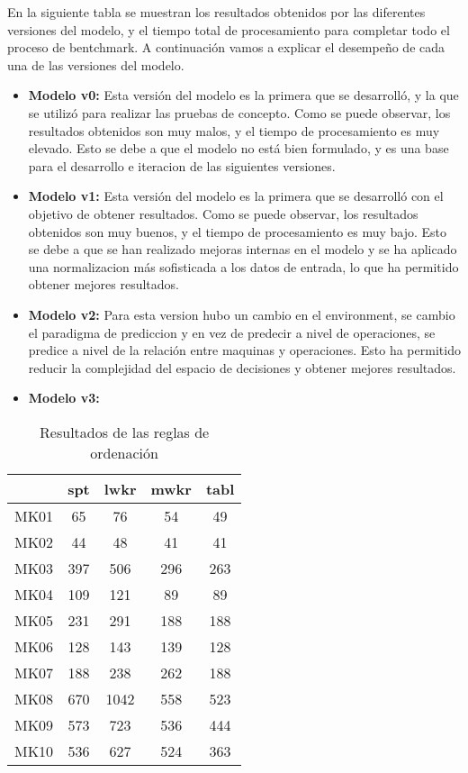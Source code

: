 En la siguiente tabla se muestran los resultados obtenidos por las
diferentes versiones del modelo, y el tiempo total de procesamiento
para completar todo el proceso de bentchmark. A continuación vamos a
explicar el desempeño de cada una de las versiones del modelo.
\begin{itemize}
    \item \textbf{Modelo v0:} Esta versión del modelo es la primera que se
        desarrolló, y la que se utilizó para realizar las pruebas de
        concepto. Como se puede observar, los resultados obtenidos son
        muy malos, y el tiempo de procesamiento es muy elevado. Esto
        se debe a que el modelo no está bien formulado, y es una base
        para el desarrollo e iteracion de las siguientes versiones.
    \item \textbf{Modelo v1:} Esta versión del modelo es la primera que
        se desarrolló con el objetivo de obtener resultados. Como se
        puede observar, los resultados obtenidos son muy buenos, y el
        tiempo de procesamiento es muy bajo. Esto se debe a que se han
        realizado mejoras internas en el modelo y se ha aplicado una
        normalizacion más sofisticada a los datos de entrada, lo que
        ha permitido obtener mejores resultados.
    \item \textbf{Modelo v2:} Para esta version hubo un cambio en el
        environment, se cambio el paradigma de prediccion y en vez
        de predecir a nivel de operaciones, se predice a nivel de
        la relación entre maquinas y operaciones. Esto ha permitido
        reducir la complejidad del espacio de decisiones y obtener
        mejores resultados.
    \item \textbf{Modelo v3:}
\end{itemize}


\begin{table}[ht]
    \centering
    \begin{tabular}[ht]{|l|cccc|}
        \hline
                  & spt & lwkr & mwkr & tabl \\
        \hline
        MK01      & 65      & 76    & 54    & 49    \\
        MK02      & 44      & 48    & 41    & 41    \\
        MK03      & 397     & 506   & 296   & 263   \\
        MK04      & 109     & 121   & 89    & 89    \\
        MK05      & 231     & 291   & 188   & 188   \\
        MK06      & 128     & 143   & 139   & 128   \\
        MK07      & 188     & 238   & 262   & 188   \\
        MK08      & 670     & 1042  & 558   & 523   \\
        MK09      & 573     & 723   & 536   & 444   \\
        MK10      & 536     & 627   & 524   & 363   \\
        \hline
    \end{tabular}
    \caption{Resultados de las reglas de ordenación}
\end{table}

